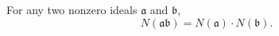 For any two nonzero ideals $\mathfrak{a}$ and $\mathfrak{b}$,
$$N(\mathfrak{a}\mathfrak{b}) = N(\mathfrak{a}) \cdot N(\mathfrak{b}).$$
